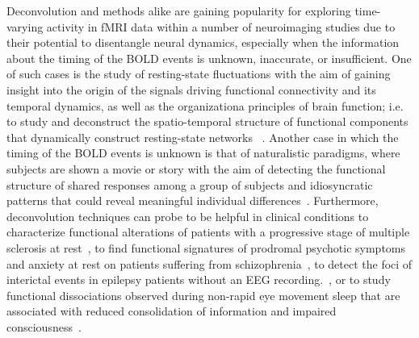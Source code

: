 Deconvolution and methods alike are gaining popularity for exploring time-varying activity in fMRI data within a number of neuroimaging studies due to their potential to disentangle neural dynamics, especially when the information about the timing of the BOLD events is unknown, inaccurate, or insufficient. One of such cases is the study of resting-state fluctuations with the aim of gaining insight into the origin of the signals driving functional connectivity and its temporal dynamics, as well as the organizationa principles of brain function; i.e. to study and deconstruct the spatio-temporal structure of functional components that dynamically construct resting-state networks ~\cite{petridou2013PeriodsRestFMRI,karahanoglu2015TransientBrainActivity,karahanoglu2017DynamicsLargescaleFMRI,kinany2020DynamicFunctionalConnectivity,gonzalez-castillo2019ImagingSpontaneousFlow,allan2015FunctionalConnectivityMRI, zamaniesfahlani2020HighamplitudeCofluctuationsCortical}. Another case in which the timing of the BOLD events is unknown is that of naturalistic paradigms, where subjects are shown a movie or story with the aim of detecting the functional structure of shared responses among a group of subjects and idiosyncratic patterns that could reveal meaningful individual differences~\cite{finn2020MoviewatchingOutperformsRest,finn2020IdiosynchronySharedResponses,betzel2020TemporalFluctuationsBrain,faskowitz2020EdgecentricFunctionalNetwork}. Furthermore, deconvolution techniques can probe to be helpful in clinical conditions to characterize functional alterations of patients with a progressive stage of multiple sclerosis at rest~\cite{bommarito2020FunctionalNetworkDynamicsa}, to find functional signatures of prodromal psychotic symptoms and anxiety at rest on patients suffering from schizophrenia~\cite{zoller2019LargeScaleBrainNetwork}, to detect the foci of interictal events in epilepsy patients without an EEG recording.~\cite{lopes2012DetectionEpilepticActivity}, or to study functional dissociations observed during non-rapid eye movement sleep that are associated with reduced consolidation of information and impaired consciousness~\cite{tarun2021NREMSleepStagesa}.

